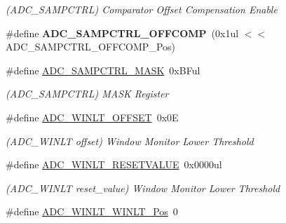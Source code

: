 \begin{DoxyCompactItemize}
\begin{DoxyCompactList}\small\item\em (A\+D\+C\+\_\+\+S\+A\+M\+P\+C\+T\+R\+L) Comparator Offset Compensation Enable \end{DoxyCompactList}\item 
\hypertarget{group___s_a_m_l21___a_d_c_ga97792095121e20dcbd6052cf371d0746}{}\#define {\bfseries A\+D\+C\+\_\+\+S\+A\+M\+P\+C\+T\+R\+L\+\_\+\+O\+F\+F\+C\+O\+M\+P}~(0x1ul $<$$<$ A\+D\+C\+\_\+\+S\+A\+M\+P\+C\+T\+R\+L\+\_\+\+O\+F\+F\+C\+O\+M\+P\+\_\+\+Pos)\label{group___s_a_m_l21___a_d_c_ga97792095121e20dcbd6052cf371d0746}

\item 
\hypertarget{group___s_a_m_l21___a_d_c_ga707778fb7e26c8edc7cceb8646a9c1d9}{}\#define \hyperlink{group___s_a_m_l21___a_d_c_ga707778fb7e26c8edc7cceb8646a9c1d9}{A\+D\+C\+\_\+\+S\+A\+M\+P\+C\+T\+R\+L\+\_\+\+M\+A\+S\+K}~0x\+B\+Ful\label{group___s_a_m_l21___a_d_c_ga707778fb7e26c8edc7cceb8646a9c1d9}

\begin{DoxyCompactList}\small\item\em (A\+D\+C\+\_\+\+S\+A\+M\+P\+C\+T\+R\+L) M\+A\+S\+K Register \end{DoxyCompactList}\item 
\hypertarget{group___s_a_m_l21___a_d_c_ga8fd9cf580953e45e7f7b05deb9d5ac48}{}\#define \hyperlink{group___s_a_m_l21___a_d_c_ga8fd9cf580953e45e7f7b05deb9d5ac48}{A\+D\+C\+\_\+\+W\+I\+N\+L\+T\+\_\+\+O\+F\+F\+S\+E\+T}~0x0\+E\label{group___s_a_m_l21___a_d_c_ga8fd9cf580953e45e7f7b05deb9d5ac48}

\begin{DoxyCompactList}\small\item\em (A\+D\+C\+\_\+\+W\+I\+N\+L\+T offset) Window Monitor Lower Threshold \end{DoxyCompactList}\item 
\hypertarget{group___s_a_m_l21___a_d_c_ga3f5d0deb6bcb3a591e59ab0b85dc048b}{}\#define \hyperlink{group___s_a_m_l21___a_d_c_ga3f5d0deb6bcb3a591e59ab0b85dc048b}{A\+D\+C\+\_\+\+W\+I\+N\+L\+T\+\_\+\+R\+E\+S\+E\+T\+V\+A\+L\+U\+E}~0x0000ul\label{group___s_a_m_l21___a_d_c_ga3f5d0deb6bcb3a591e59ab0b85dc048b}

\begin{DoxyCompactList}\small\item\em (A\+D\+C\+\_\+\+W\+I\+N\+L\+T reset\+\_\+value) Window Monitor Lower Threshold \end{DoxyCompactList}\item 
\hypertarget{group___s_a_m_l21___a_d_c_ga8d8679254a2a5ba70a7378316be2b2e2}{}\#define \hyperlink{group___s_a_m_l21___a_d_c_ga8d8679254a2a5ba70a7378316be2b2e2}{A\+D\+C\+\_\+\+W\+I\+N\+L\+T\+\_\+\+W\+I\+N\+L\+T\+\_\+\+Pos}~0\label{group___s_a_m_l21___a_d_c_ga8d8679254a2a5ba70a7378316be2b2e2}


\end{DoxyCompactItemize}
